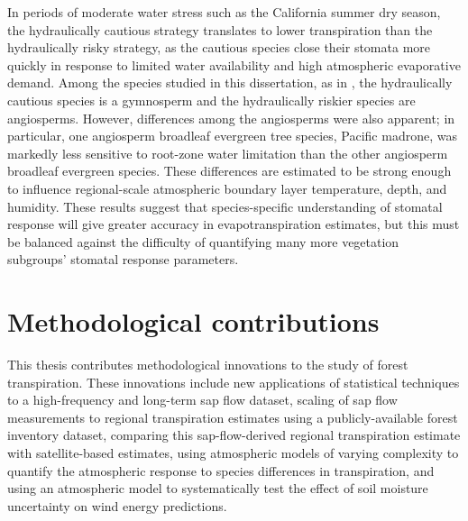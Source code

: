 In periods of moderate water stress such as the California summer dry season, the hydraulically cautious strategy translates to lower transpiration than the hydraulically risky strategy, as the cautious species close their stomata more quickly in response to limited water availability and high atmospheric evaporative demand.  Among the species studied in this dissertation, as in \cite{choat2012global}, the hydraulically cautious species is a gymnosperm and the hydraulically riskier species are angiosperms.  However, differences among the angiosperms were also apparent; in particular, one angiosperm broadleaf evergreen tree species, Pacific madrone, was markedly less sensitive to root-zone water limitation than the other angiosperm broadleaf evergreen species.  These differences are estimated to be strong enough to influence regional-scale atmospheric boundary layer temperature, depth, and humidity.  These results suggest that species-specific understanding of stomatal response will give greater accuracy in evapotranspiration estimates, but this must be balanced against the difficulty of quantifying many more vegetation subgroups' stomatal response parameters.

\section{Methodological contributions}

This thesis contributes methodological innovations to the study of forest transpiration.  These innovations include new applications of statistical techniques to a high-frequency and long-term sap flow dataset, scaling of sap flow measurements to regional transpiration estimates using a publicly-available forest inventory dataset, comparing this sap-flow-derived regional transpiration estimate with satellite-based estimates, using atmospheric models of varying complexity to quantify the atmospheric response to species differences in transpiration, and using an atmospheric model to systematically test the effect of soil moisture uncertainty on wind energy predictions.

